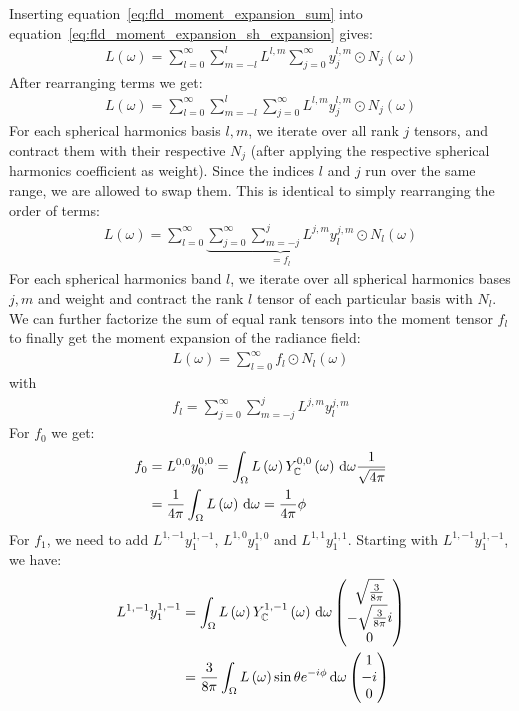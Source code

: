 Inserting equation~\ref{eq:fld_moment_expansion_sum} into equation~\ref{eq:fld_moment_expansion_sh_expansion} gives:
\begin{align}
L\left(\omega\right) =
\sum_{l=0}^{\infty}\sum_{m=-l}^{l}L^{l,m}\sum_{j=0}^\infty{y^{l,m}_j\odot N_j(\omega)}
\end{align}
After rearranging terms we get:
\begin{align}
L\left(\omega\right) =
\sum_{l=0}^{\infty}\sum_{m=-l}^{l}\sum_{j=0}^\infty{L^{l,m}y^{l,m}_j\odot N_j(\omega)}
\end{align}
For each spherical harmonics basis $l,m$, we iterate over all rank $j$ tensors, and contract them with their respective $N_j$ (after applying the respective spherical harmonics coefficient as weight). Since the indices $l$ and $j$ run over the same range, we are allowed to swap them. This is identical to simply rearranging the order of terms:
\begin{align}
L\left(\omega\right) =
\sum_{l=0}^{\infty}\underbrace{\sum_{j=0}^\infty\sum_{m=-j}^{j}{L^{j,m}y^{j,m}_l}}_{=f_l}
\odot N_l(\omega)
\end{align}
For each spherical harmonics band $l$, we iterate over all spherical harmonics bases $j,m$ and weight and contract the rank $l$ tensor of each particular basis with $N_l$. We can further factorize the sum of equal rank tensors into the moment tensor $f_l$ to finally get the moment expansion of the radiance field:
\begin{align}
L\left(\omega\right) =
\sum_{l=0}^{\infty}f_l\odot N_l(\omega)
\end{align}
with
\begin{align}
f_l = \sum_{j=0}^\infty\sum_{m=-j}^{j}{L^{j,m}y^{j,m}_l}
\end{align}
For $f_0$ we get:
\begin{align}
f_0 &= L^{0,0}y^{0,0}_0 = \int_\Omega{L\left(\omega\right)Y_{\mathbb{C}}^{0,0}\left(\omega\right)\,\mathrm{d}\omega}\frac{1}{\sqrt{4\pi}}\\
&=
\frac{1}{4\pi}\int_\Omega{L\left(\omega\right)\,\mathrm{d}\omega} =
\frac{1}{4\pi}\phi
\end{align}
For $f_1$, we need to add $L^{1,-1}y^{1,-1}_1$, $L^{1,0}y^{1,0}_1$ and $L^{1,1}y^{1,1}_1$. Starting with $L^{1,-1}y^{1,-1}_1$, we have:
\begin{align}
L^{1,-1}y^{1,-1}_1 &= 
\int_\Omega{L\left(\omega\right)Y_{\mathbb{C}}^{1,-1}\left(\omega\right)\,\mathrm{d}\omega}
\begin{pmatrix}\sqrt{\frac{3}{8\pi}}  \\ -\sqrt{\frac{3}{8\pi}}i \\ 0 \end{pmatrix}
\\
&= 
\frac{3}{8\pi}\int_\Omega{L\left(\omega\right)\operatorname{sin}\theta e^{-i\phi}\,\mathrm{d}\omega}
\begin{pmatrix}1  \\ -i \\ 0 \end{pmatrix}
\end{align}
